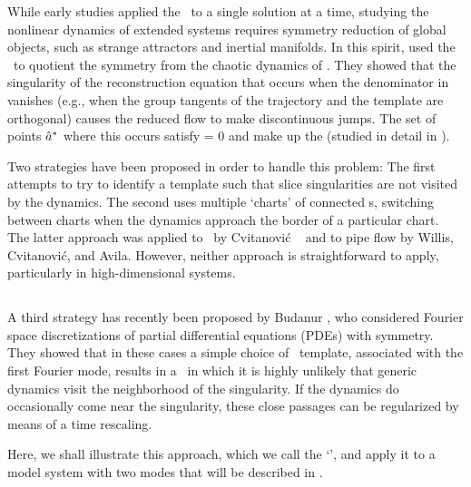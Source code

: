 \documentclass[aip,cha,
reprint,
secnumarabic,
nofootinbib, tightenlines,
nobibnotes, showkeys, showpacs,
superscriptaddress,
]{revtex4-1}
\begin{document}
While early studies applied the \mslices\ to a single solution at a time, studying
the nonlinear dynamics of extended systems requires symmetry reduction of
global objects, such as strange attractors and inertial manifolds. In
this spirit,  used the \mslices\ to
quotient the  symmetry from the chaotic dynamics of \cLf. They
showed that the singularity of the reconstruction equation that occurs
when the denominator in  vanishes (e.g., when
the group tangents of the trajectory and the template are orthogonal)
causes the reduced flow to make discontinuous jumps. The set of points
$\hat{a}^*$ where this occurs satisfy
\beq
\braket{\groupTan(\sspRed^*)}{\sliceTan{}} = 0
and make up the \emph{\sliceBord} (studied in detail in ).

Two strategies have been proposed in order to handle this problem: The first attempts to
try to identify a template such that slice singularities are not visited
by the dynamics. The second uses multiple `charts' of connected
\slicePlane s, switching between charts when the
dynamics approach the border of a particular chart. The latter approach was applied to \cLf\ by Cvitanovi\'{c} \etal~ and
to pipe flow by Willis, Cvitanovi\'{c}, and Avila.
However, neither approach is straightforward to apply, particularly in
high-dimensional systems.

\subsection{\FFslice}
\label{sect:fFslice}

A third strategy has recently been proposed by Budanur
\etal{}, who considered Fourier space discretizations of
partial differential equations (PDEs) with  symmetry. They showed
that in these cases a simple choice of \slice\ template, associated with
the first Fourier mode, results in a \slice\ in which it is highly
unlikely that generic dynamics visit the neighborhood of the singularity.
If the dynamics do occasionally come near the singularity, these close
passages can be regularized by means of a time rescaling.

Here, we shall illustrate this approach, which we call the
`\fFslice', and apply it to a model system with two modes that will be
described in .
\end{document}
